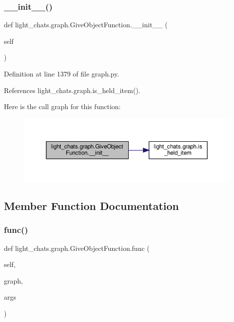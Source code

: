 \subsubsection{\texorpdfstring{\+\_\+\+\_\+init\+\_\+\+\_\+()}{\_\_init\_\_()}}
{\footnotesize\ttfamily def light\+\_\+chats.\+graph.\+Give\+Object\+Function.\+\_\+\+\_\+init\+\_\+\+\_\+ (\begin{DoxyParamCaption}\item[{}]{self }\end{DoxyParamCaption})}



Definition at line 1379 of file graph.\+py.



References light\+\_\+chats.\+graph.\+is\+\_\+held\+\_\+item().

Here is the call graph for this function\+:
\nopagebreak
\begin{figure}[H]
\begin{center}
\leavevmode
\includegraphics[width=350pt]{classlight__chats_1_1graph_1_1GiveObjectFunction_a1ad77504961b2163c1ec8789c89022b9_cgraph}
\end{center}
\end{figure}


\subsection{Member Function Documentation}
\mbox{\label{classlight__chats_1_1graph_1_1GiveObjectFunction_a8debb985c3252b31e92837bb6cb0d227}} 
\subsubsection{\texorpdfstring{func()}{func()}}
{\footnotesize\ttfamily def light\+\_\+chats.\+graph.\+Give\+Object\+Function.\+func (\begin{DoxyParamCaption}\item[{}]{self,  }\item[{}]{graph,  }\item[{}]{args }\end{DoxyParamCaption})}

